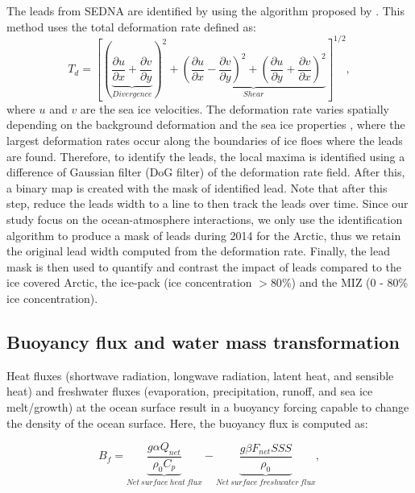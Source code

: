 \documentclass[lineno,sn-basic]{sn-jnl}%
\begin{document}
The leads from SEDNA are identified by using the algorithm proposed by \citet{Hutter_identification_2019}. This method uses the total deformation rate defined as: 
\begin{equation}
    T_d = \left[\left(\underbrace{\frac{\partial u}{\partial x} +\frac{\partial v}{\partial y}}_{Divergence}\right)^2 + \underbrace{\left(\frac{\partial u}{\partial x} - \frac{\partial v}{\partial y}\right)^2+ \left(\frac{\partial u}{\partial y} + \frac{\partial v}{\partial x}\right)^2}_{Shear}\right]^{1/2},
\end{equation}
where $u$ and $v$ are the sea ice velocities. The deformation rate varies spatially depending on the background deformation and the sea ice properties \citep{Reiser_LKF_2020}, where the largest deformation rates occur along the boundaries of ice floes where the leads are found. Therefore, to identify the leads, the local maxima is identified using a difference of Gaussian filter (DoG filter) of the deformation rate field. After this, a binary map is created with the mask of identified lead. Note that after this step, \citet{Hutter_identification_2019} reduce the leads width to a line to then track the leads over time. Since our study focus on the ocean-atmosphere interactions, we only use the identification algorithm to produce a mask of leads during 2014 for the Arctic, thus we retain the original lead width computed from the deformation rate. Finally, the lead mask is then used to quantify and contrast the impact of leads compared to the ice covered Arctic, the ice-pack (ice concentration $> 80\%$) and the MIZ (0 - 80\% ice concentration).

\subsection*{Buoyancy flux and water mass transformation}

Heat fluxes (shortwave radiation, longwave radiation, latent heat, and sensible heat) and freshwater fluxes (evaporation, precipitation, runoff, and sea ice melt/growth) at the ocean surface result in a buoyancy forcing capable to change the density of the ocean surface. Here, the buoyancy flux is computed as:

\begin{equation}
    B_f = \underbrace{\frac{g \alpha Q_{net}}{\rho_0 C_p}}_{Net\ surface\ heat\ flux} - \underbrace{\frac{g \beta F_{net} SSS }{\rho_0}}_{Net\ surface\ freshwater\ flux},
\end{equation}
\end{document}
